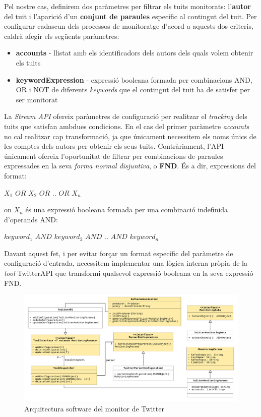 Pel nostre cas, definirem dos paràmetres per filtrar els tuits monitorats: l'\textbf{autor} del tuit i l'aparició d'un \textbf{conjunt de paraules} específic al contingut del tuit. Per configurar cadascun dels processos de monitoratge d'acord a aquests dos criteris, caldrà afegir els següents paràmetres:

\begin{itemize}
\item \textbf{accounts} - llistat amb els identificadors dels autors dels quals volem obtenir els tuits 
\item \textbf{keywordExpression} - expressió booleana formada per combinacions AND, OR i NOT de diferents \textit{keywords} que el contingut del tuit ha de satisfer per ser monitorat
\end{itemize}

La \textit{Stream API} ofereix paràmetres de configuració per realitzar el \textit{tracking} dels tuits que satisfan ambdues condicions. En el cas del primer paràmetre \textit{accounts} no cal realitzar cap transformació, ja que únicament necessitem els noms únics de les comptes dels autors per obtenir els seus tuits. Contràriament, l'API únicament ofereix l'oportunitat de filtrar per combinacions de paraules expressades en la seva \textit{forma normal disjuntiva}, o \textbf{FND}. És a dir, expressions del format:\\

\centerline{\textit{$X_{1} \,\, OR \,\, X_{2} \,\, OR \,\, .. \,\, OR \,\, X_{n}$}}\bigskip

\noindent
on $X_{n}$ és una expressió booleana formada per una combinació indefinida d'operands AND:\\

\centerline{\textit{$keyword_{1} \,\, AND \,\, keyword_{2} \,\, AND \,\, .. \,\, AND \,\, keyword_{n}$}}\bigskip

Davant aquest fet, i per evitar forçar un format específic del paràmetre de configuració d'entrada, necessitem implementar una lògica interna pròpia de la \textit{tool} TwitterAPI que transformi qualsevol expressió booleana en la seva expressió FND. \\

\begin{figure}
\centering
\includegraphics[width=14cm]{Figures/Figure6}
\decoRule
\caption[Arquitectura software del monitor de Twitter]{Arquitectura software del monitor de Twitter}
\label{fig:Figura6}
\end{figure}

